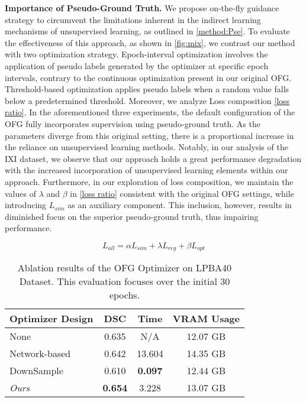 \documentclass[10pt,twocolumn,letterpaper]{article}
\begin{document}
\textbf{Importance of Pseudo-Ground Truth.} We propose on-the-fly guidance strategy to circumvent the limitations inherent in the indirect learning mechanisms of unsupervised learning, as outlined in \cref{method:Pse}. To evaluate the effectiveness of this approach, as shown in \cref{fig:mix}, we contrast our method with two optimization strategy. Epoch-interval optimization involves the application of pseudo labels generated by the optimizer at specific epoch intervals, contrary to the continuous optimization present in our original OFG. Threshold-based optimization applies pseudo labels when a random value falls below a predetermined threshold. Moreover, we analyze Loss composition \cref{loss ratio}.
In the aforementioned three experiments, the default configuration of the OFG fully incorporates supervision using pseudo-ground truth. As the parameters diverge from this original setting, there is a proportional increase in the reliance on unsupervised learning methods.
Notably, in our analysis of the IXI dataset, we observe that our approach holds a great performance degradation with the increased incorporation of unsupervised learning elements within our approach.
Furthermore, in our exploration of loss composition, we maintain the values of $\lambda$ and $\beta$ in \cref{loss ratio} consistent with the original OFG settings, while introducing $L_{sim}$ as an auxiliary component. This inclusion, however, results in diminished focus on the superior pseudo-ground truth, thus impairing performance.

\begin{equation}
    L_{all} = \alpha L_{sim} + \lambda L_{reg} + \beta L_{opt}
    \label{loss ratio}
\end{equation}

\begin{table}
  \centering
  \small{
  \begin{tabular}{lccc}
    \toprule
    Optimizer Design &  DSC & Time & VRAM Usage \\
    \midrule
    None & 0.635 & N/A & 12.07 GB \\
    Network-based & 0.642 & 13.604 & 14.35 GB \\
    DownSample & 0.610 & \textbf{0.097} & 12.44 GB \\
    \midrule
    \textit{Ours} & \textbf{0.654} & 3.228 & 13.07 GB \\
    \bottomrule
  \end{tabular}
  }
  \caption{Ablation results of the OFG Optimizer on LPBA40 Dataset. This evaluation focuses over the initial 30 epochs.}
  \label{tab:ablation}
\end{table}
\end{document}
